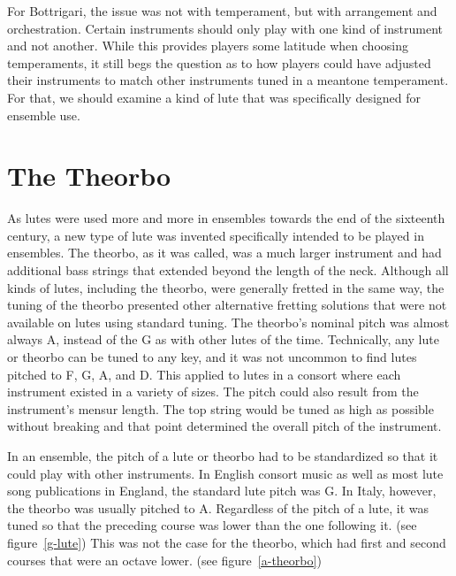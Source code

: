 For Bottrigari, the issue was not with temperament, but with arrangement and orchestration. Certain instruments should
only play with one kind of instrument and not another. While this provides players some latitude when choosing
temperaments, it still begs the question as to how players could have adjusted their instruments to match other
instruments tuned in a meantone temperament. For that, we should examine a kind of lute that was specifically designed
for ensemble use.

\section{The Theorbo}

As lutes were used more and more in ensembles towards the end of the sixteenth century, a new type of lute was invented
specifically intended to be played in ensembles. The theorbo, as it was called, was a much larger instrument and had
additional bass strings that extended beyond the length of the neck. Although all kinds of lutes, including the theorbo,
were generally fretted in the same way, the tuning of the theorbo presented other alternative fretting solutions that
were not available on lutes using standard tuning. The theorbo's nominal pitch was almost always A, instead of the G as
with other lutes of the time. Technically, any lute or theorbo can be tuned to any key, and it was not uncommon to find
lutes pitched to F, G, A, and D. This applied to lutes in a consort where each instrument existed in a variety of sizes.
The pitch could also result from the instrument's mensur length. The top string would be tuned as high as possible
without breaking and that point determined the overall pitch of the instrument.

In an ensemble, the pitch of a lute or theorbo had to be standardized so that it could play with other instruments. In
English consort music as well as most lute song publications in England, the standard lute pitch was G. In Italy,
however, the theorbo was usually pitched to A. Regardless of the pitch of a lute, it was tuned so that the preceding
course was lower than the one following it. (see figure~\ref{g-lute}) This was not the case for the theorbo, which had
first and second courses that were an octave lower. (see figure~\ref{a-theorbo})

